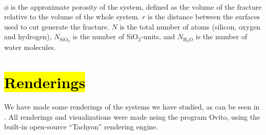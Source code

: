 \begin{table}[htpb]
{        \\%
%
        $\phi$ is the approximate porosity of the system, defined as the volume of the fracture relative to the volume of the whole system. $r$ is the distance between the surfaces used to cut generate the fracture. $N$ is the total number of atoms (silicon, oxygen and hydrogen), $N_\text{SiO$_2$}$ is the number of SiO$_2$-units, and $N_\text{H$_2$O}$ is the number of water molecules. %
%
        \label{tab:systems}%
    }
\end{table}%

\FloatBarrier
\section[Renderings]{\hl{Renderings}}
We have made some renderings of the systems we have studied, as can be seen in . All renderings and visualizations were made using the program Ovito\cite{stukowski2010ovito}, using the built-in open-source ``Tachyon'' rendering engine.

